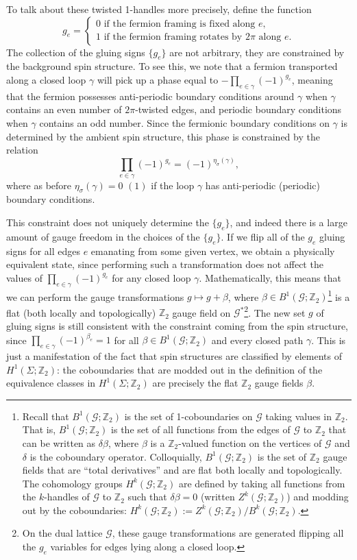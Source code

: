 \documentclass[12pt,a4paper]{article}
\newcommand{\mcg}{\mathcal{G}}
\newcommand{\zt}{\mathbb{Z}_2}
\newcommand\be            {\begin{equation}}
\newcommand\ee            {\end{equation}}
\begin{document}
To talk about these twisted 1-handles more precisely, define the function 
\be g_e = \begin{cases} 0 \text{\ if the fermion framing is fixed along $e$,}\\ 
1 \text{\ if the fermion framing rotates by $2\pi$ along $e$.}\end{cases}\ee
The collection of the gluing signs $\{g_e\}$ are not arbitrary, they are constrained by the background spin structure. 
To see this, we note that a fermion transported along a closed loop $\gamma$ will pick up a phase equal to $-\prod_{e\in \gamma}(-1)^{g_e}$, meaning that the fermion possesses anti-periodic boundary conditions around $\gamma$ when $\gamma$ contains an even number of $2\pi$-twisted edges, and periodic boundary conditions when $\gamma$ contains an odd number. 
Since the fermionic boundary conditions on $\gamma$ is determined by the ambient spin structure, this phase is constrained by the relation
\be \prod_{e\in \gamma}(-1)^{g_e} = (-1)^{\eta_\sigma(\gamma)},\ee 
where as before $\eta_\sigma(\gamma) = 0$ $(1)$ if the loop $\gamma$ has anti-periodic (periodic) boundary conditions. 

This constraint does not uniquely determine the $\{g_e\}$, and indeed
there is a large amount of gauge freedom in the choices of the $\{g_e\}$. 
If we flip all of the $g_e$ gluing signs for all edges $e$ emanating from some given vertex, we obtain a physically equivalent state, since performing such a transformation does not affect the values of $\prod_{e\in \gamma}(-1)^{g_e}$ for any closed loop $\gamma$. 
Mathematically, this means that we can perform the gauge transformations $g\mapsto g + \beta$, where $\beta \in B^1(\mcg;\zt)$\footnote{Recall that $B^1(\mcg;\zt)$ is the set of 1-coboundaries on $\mcg$ taking values in $\zt$. That is, $B^1(\mcg;\zt)$ is the set of all functions from the edges of $\mcg$ to $\zt$ that can be written as $\delta \beta$, where $\beta$ is a $\zt$-valued function on the vertices of $\mcg$ and $\delta$ is the coboundary operator. Colloquially, $B^1(\mcg;\zt)$ is the set of $\zt$ gauge fields that are ``total derivatives'' and are flat both locally and topologically. The cohomology groups $H^k(\mcg;\zt)$ are defined by taking all functions from the $k$-handles of $\mcg$ to $\zt$ such that $\delta \beta=0$ (written $Z^k(\mcg;\zt)$) and modding out by the coboundaries: $H^k(\mcg;\zt) := Z^k(\mcg;\zt) / B^k(\mcg;\zt)$.} is a flat (both locally and topologically) $\zt$ gauge field on $\mcg^*$\footnote{On the dual lattice $\mcg$, these gauge transformations are generated flipping all the $g_e$ variables for edges lying along a closed loop.}. 
The new set $g$ of gluing signs is still consistent with the constraint coming from the spin structure, since $\prod_{e\in \gamma}(-1)^{\beta_e} = 1$ for all $\beta \in B^1(\mcg;\zt)$ and every closed path $\gamma$. 
This is just a manifestation of the fact that spin structures are classified by elements of $H^1(\Sigma;\zt)$: the coboundaries that are modded out in the definition of the equivalence classes in $H^1(\Sigma;\zt)$ are precisely the flat $\mathbb{Z}_2$ gauge fields $\beta$. 
\end{document}
